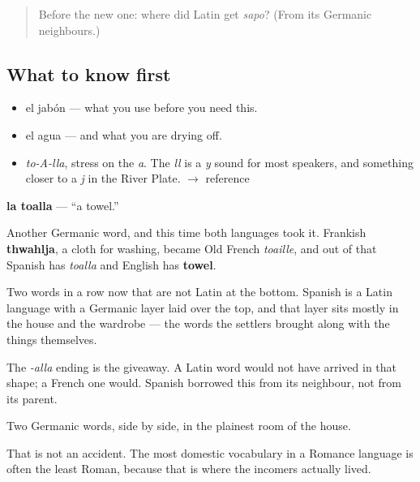 \label{lesson:ES-C287-toalla}



\begin{quote}
Before the new one: where did Latin get \emph{sapo}? (From its Germanic neighbours.)
\end{quote}

\subsection*{What to know first}
\begin{itemize}
\raggedright
  \item el jabón — what you use before you need this.
  \item el agua — and what you are drying off.
\end{itemize}

\begin{sounds}
\begin{itemize}
\raggedright
  \item \emph{to-A-lla}, stress on the \emph{a}. The \emph{ll} is a \emph{y} sound for most speakers, and something closer to a \emph{j} in the River Plate. $\to$ reference
\end{itemize}
\end{sounds}

\begin{cousinweb}
\textbf{la toalla} — \textquotedblleft{}a towel.\textquotedblright{}

Another Germanic word, and this time both languages took it. Frankish \textbf{thwahlja}, a cloth for washing, became Old French \emph{toaille}, and out of that Spanish has \emph{toalla} and English has \textbf{towel}.

Two words in a row now that are not Latin at the bottom. Spanish is a Latin language with a Germanic layer laid over the top, and that layer sits mostly in the house and the wardrobe — the words the settlers brought along with the things themselves.

The \emph{-alla} ending is the giveaway. A Latin word would not have arrived in that shape; a French one would. Spanish borrowed this from its neighbour, not from its parent.
\end{cousinweb}

\begin{grammarlens}[title={What you've built}]
Two Germanic words, side by side, in the plainest room of the house.

That is not an accident. The most domestic vocabulary in a Romance language is often the least Roman, because that is where the incomers actually lived.
\end{grammarlens}

